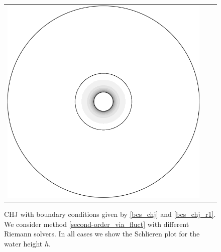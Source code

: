 \documentclass[preprint, 11pt]{article}
\begin{document}
\begin{figure}[!h]
{\begin{tabular}{ccc}
      \includegraphics[scale=0.3]{figures/chj_r1_blended_p3.png}
    \end{tabular}
    }
    \caption{CHJ with boundary conditions given by \eqref{bcs_chj} and \eqref{bcs_chj_r1}.    
      We consider method \eqref{second-order_via_fluct} with different Riemann solvers.
      In all cases we show the Schlieren plot for the water height $h$.
    \label{fig:chj_r1}}
\end{figure}
\end{document}
